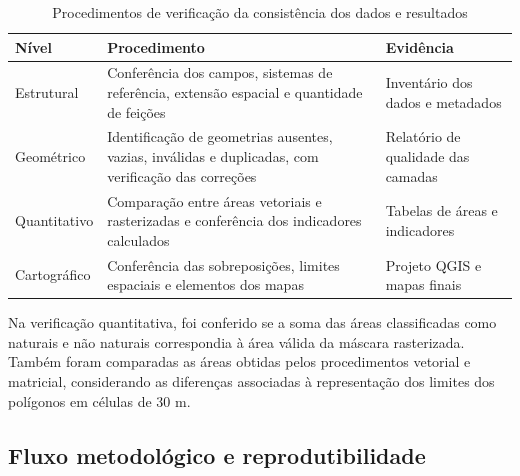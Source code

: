\begin{table}[H]
\centering
\caption{Procedimentos de verificação da consistência dos dados e resultados}
\label{tab:validacao}

\begingroup
\small
\SingleSpacing

\renewcommand{\arraystretch}{1.45}

\setlength{\tabcolsep}{6pt}

\begin{tabularx}{\textwidth}{
>{\RaggedRight\arraybackslash}p{2.2cm}
>{\RaggedRight\arraybackslash}X
>{\RaggedRight\arraybackslash}p{3.6cm}
}
\toprule

\textbf{Nível} &
\textbf{Procedimento} &
\textbf{Evidência} \\

\midrule

Estrutural &
Conferência dos campos, sistemas de referência, extensão espacial e quantidade de feições &
Inventário dos dados e metadados \\

Geométrico &
Identificação de geometrias ausentes, vazias, inválidas e duplicadas, com verificação das correções &
Relatório de qualidade das camadas \\

Quantitativo &
Comparação entre áreas vetoriais e rasterizadas e conferência dos indicadores calculados &
Tabelas de áreas e indicadores \\

Cartográfico &
Conferência das sobreposições, limites espaciais e elementos dos mapas &
Projeto QGIS e mapas finais \\

\bottomrule
\end{tabularx}

\vspace{0.20cm}


\endgroup
\end{table}

Na verificação quantitativa, foi conferido se a soma das áreas classificadas como naturais e não naturais correspondia à área válida da máscara rasterizada. Também foram comparadas as áreas obtidas pelos procedimentos vetorial e matricial, considerando as diferenças associadas à representação dos limites dos polígonos em células de 30 m.

\subsection{Fluxo metodológico e reprodutibilidade}

